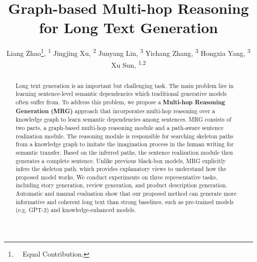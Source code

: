 \documentclass[letterpaper]{article} %
\title{Graph-based Multi-hop Reasoning for Long Text Generation}
\author{
Liang Zhao\thanks{\ \ Equal Contribution.}, \textsuperscript{\rm 1} 
Jingjing Xu\footnotemark[1], \textsuperscript{\rm 2} 
Junyang Lin, \textsuperscript{\rm 3} 
Yichang Zhang, \textsuperscript{\rm 3} 
Hongxia Yang, \textsuperscript{\rm 3} 
Xu Sun, \textsuperscript{\rm 1,2} \\
}
\begin{document}
\maketitle

\begin{abstract}
Long text generation is an important but challenging task. 
The main problem lies in learning sentence-level semantic dependencies which traditional generative models often suffer from. 
To address this problem, we propose a
\textbf{Multi-hop Reasoning Generation (MRG)} approach that
 incorporates multi-hop reasoning over a knowledge graph to learn semantic dependencies among sentences. MRG consists of two parts, a graph-based multi-hop reasoning module and a path-aware sentence realization module. The reasoning module is responsible for 
searching skeleton paths from a knowledge graph
 to imitate the imagination process in the human writing for semantic transfer. Based on the inferred paths, the sentence realization module then generates a complete sentence. 
 Unlike previous black-box models, MRG explicitly infers the skeleton path, which provides explanatory views to understand how the proposed model works.  
We conduct experiments on three representative tasks, including story generation, review generation, and product description generation.
 Automatic and manual evaluation show that
our proposed method can generate more informative and coherent long text than
strong baselines, such as pre-trained models (e.g. GPT-2) and knowledge-enhanced models. 

\end{abstract}
\end{document}
